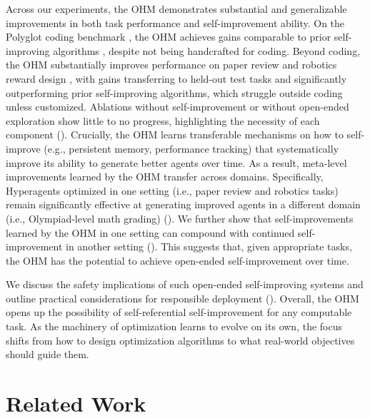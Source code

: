 \documentclass[]{fairmeta}
\begin{document}
Across our experiments, the OHM demonstrates substantial and generalizable improvements in both task performance and self-improvement ability. On the Polyglot coding benchmark \citep{gauthier2024polyglot}, the OHM achieves gains comparable to prior self-improving algorithms \citep[i.e., the Darwin G\"odel Machine,][]{zhang2025darwin}, despite not being handcrafted for coding. Beyond coding, the OHM substantially improves performance on paper review \citep{zhao2026apres} and robotics reward design \citep{genesis2024}, with gains transferring to held-out test tasks and significantly outperforming prior self-improving algorithms, which struggle outside coding unless customized. Ablations without self-improvement or without open-ended exploration show little to no progress, highlighting the necessity of each component (). Crucially, the OHM learns transferable mechanisms on how to self-improve (e.g., persistent memory, performance tracking) that systematically improve its ability to generate better agents over time. As a result, meta-level improvements learned by the OHM transfer across domains. Specifically, Hyperagents optimized in one setting (i.e., paper review and robotics tasks) remain significantly effective at generating improved agents in a different domain (i.e., Olympiad-level math grading) (). We further show that self-improvements learned by the OHM in one setting can compound with continued self-improvement in another setting (). This suggests that, given appropriate tasks, the OHM has the potential to achieve open-ended self-improvement over time.

We discuss the safety implications of such open-ended self-improving systems and outline practical considerations for responsible deployment (). Overall, the OHM opens up the possibility of self-referential self-improvement for any computable task. As the machinery of optimization learns to evolve on its own, the focus shifts from how to design optimization algorithms to what real-world objectives should guide them.

\section{Related Work}
\label{sec:related-work}
\end{document}
